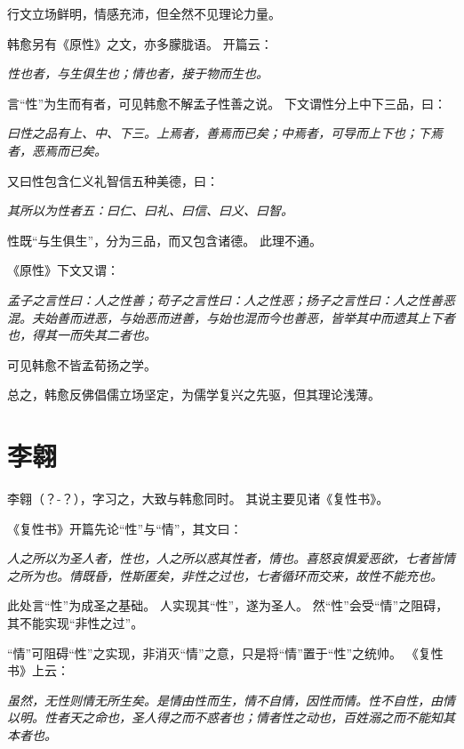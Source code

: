 \documentclass[11pt]{article}
\begin{document}
行文立场鲜明，情感充沛，但全然不见理论力量。

\newline

韩愈另有《原性》之文，亦多朦胧语。
开篇云：

\textit{性也者，与生俱生也；情也者，接于物而生也。}

言“性”为生而有者，可见韩愈不解孟子性善之说。
下文谓性分上中下三品，曰：

\textit{曰性之品有上、中、下三。上焉者，善焉而已矣；中焉者，可导而上下也；下焉者，恶焉而已矣。}

又曰性包含仁义礼智信五种美德，曰：

\textit{其所以为性者五：曰仁、曰礼、曰信、曰义、曰智。}

性既“与生俱生”，分为三品，而又包含诸德。
此理不通。

\newline

《原性》下文又谓：

\textit{孟子之言性曰：人之性善；苟子之言性曰：人之性恶；扬子之言性曰：人之性善恶混。夫始善而进恶，与始恶而进善，与始也混而今也善恶，皆举其中而遗其上下者也，得其一而失其二者也。}

可见韩愈不皆孟荀扬之学。

\newline

总之，韩愈反佛倡儒立场坚定，为儒学复兴之先驱，但其理论浅薄。

\section{李翱}
李翱（？-？），字习之，大致与韩愈同时。
其说主要见诸《复性书》。

\newline

《复性书》开篇先论“性”与“情”，其文曰：

\textit{人之所以为圣人者，性也，人之所以惑其性者，情也。喜怒哀惧爱恶欲，七者皆情之所为也。情既昏，性斯匿矣，非性之过也，七者循环而交来，故性不能充也。}

此处言“性”为成圣之基础。
人实现其“性”，遂为圣人。
然“性”会受“情”之阻碍，其不能实现“非性之过”。

\newline

“情”可阻碍“性”之实现，非消灭“情”之意，只是将“情”置于“性”之统帅。
《复性书》上云：

\textit{虽然，无性则情无所生矣。是情由性而生，情不自情，因性而情。性不自性，由情以明。性者天之命也，圣人得之而不惑者也；情者性之动也，百姓溺之而不能知其本者也。}
\end{document}
